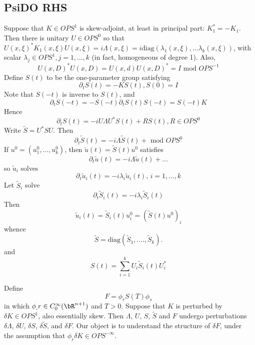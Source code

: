 \subsection{PsiDO RHS}
Suppose that $K \in OPS^1$ is skew-adjoint, at least in principal
part: $K_1^*=-K_1$. Then there is unitary $U \in OPS^0$ so that
$U(x,\xi)^*K_1(x,\xi)U(x,\xi) = i\Lambda(x,\xi) =
i\mbox{diag}(\lambda_1(x,\xi),...\lambda_k(x,\xi))$, with scalar
$\lambda_j \in OPS^1, j=1,...,k$ (in fact, homogeneous of degree
1). Also,
\begin{equation}
  \label{eqn:ortho}
  U(x,D)^*U(x,D) = U(x,d)U(x,D)^* = I \mbox{ mod } OPS^{-1}
\end{equation}
Define $S(t)$ to be the one-parameter group satisfying
\[
  \partial_t S(t) = -K S(t), S(0)=I
\]
Note that $S(-t)$ is inverse to $S(t)$, and 
\[
  \partial_t S(-t) = -S(-t) \partial_t S(t) S(-t) = S(-t)K
\]
Hence
\[
  \partial_t S(t) = -iU \Lambda U^*S(t) + RS(t), R \in OPS^0 
\]
Write $\tilde{S} = U^*SU$. Then 
\[
  \partial_t \tilde{S}(t) = -i\Lambda \tilde{S}(t) + \mbox{ mod } OPS^0 
\]
If $u^0 = (u^0_1,...,u^0_k)$, then $\tilde{u}(t) = \tilde{S}(t)u^0$ satisfies
\[
  \partial_t \tilde{u}(t) = -i\Lambda \tilde{u}(t) + ...
\]
so $\tilde{u}_i$ solves
\[
  \partial_t \tilde{u}_i(t) = -i\lambda_i \tilde{u}_i(t), \, i=1,...,k
\]
Let $\tilde{S}_i$ solve
\begin{equation}
  \label{eqn:stilde}
  \partial_t \tilde{S}_i(t) = - i\lambda_i \tilde{S}_i(t)
\end{equation}
Then
\[
  \tilde{u}_i(t) = \tilde{S}_i(t) u^0_i = (\tilde{S}(t)u^0)_i 
\]
whence
\[
  \tilde{S} = \mbox{diag}(\tilde{S}_1,....,\tilde{S}_k).
\]
and
\begin{equation}
  \label{eqn:spec}
  S(t) = \sum_{i=1}^k U_i \tilde{S}_i(t)U_i^*
\end{equation}

Define
\[
  F = \phi_r S(T) \phi_s
\]
in which $\phi_,r \in C_0^{\infty}(\bR^{n+1})$ and $T>0$. Suppose that $K$
is perturbed by $\delta K \in OPS^1$, also essentially skew. Then
$\Lambda$, $U$, $S$, $\tilde{S}$ and $F$ undergo perturbations
$\delta \Lambda$, $\delta U$, $\delta S$, $\delta \tilde{S}$, and
$\delta F$. Our object is to understand the structure of $\delta F$, under the
assumption that $\phi_r \delta K \in OPS^{-\infty}$. 

